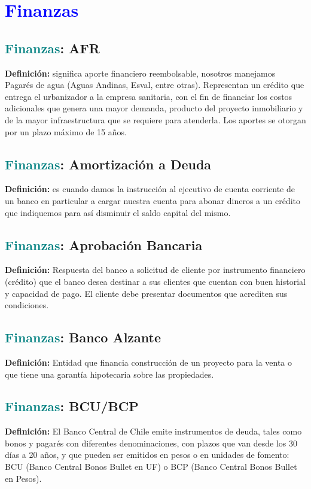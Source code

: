 \documentclass[12pt]{article}
\begin{document}
\section{\textcolor{blue}{Finanzas}}
\subsection{\textcolor{teal}{Finanzas}: AFR}
\textbf{Definición:} significa aporte financiero reembolsable, nosotros manejamos Pagarés de agua (Aguas Andinas, Esval, entre otras). Representan un crédito que entrega el urbanizador a la empresa sanitaria, con el fin de financiar los costos adicionales que genera una mayor demanda, producto del proyecto inmobiliario y de la mayor infraestructura que se requiere para atenderla. Los aportes se otorgan por un plazo máximo de 15 años.
\subsection{\textcolor{teal}{Finanzas}: Amortización a Deuda}
\textbf{Definición:} es cuando damos la instrucción al ejecutivo de cuenta corriente de un banco en particular a cargar nuestra cuenta para abonar dineros a un crédito que indiquemos para así disminuir el saldo capital del mismo. 
\subsection{\textcolor{teal}{Finanzas}: Aprobación Bancaria}
\textbf{Definición:} Respuesta del banco a solicitud de cliente por instrumento financiero (crédito) que el banco desea destinar a sus clientes que cuentan con buen historial y capacidad de pago. El cliente debe presentar documentos que acrediten sus condiciones.
\subsection{\textcolor{teal}{Finanzas}: Banco Alzante}
\textbf{Definición:} Entidad que financia construcción de un proyecto para la venta o que tiene una garantía hipotecaria sobre las propiedades. 
\subsection{\textcolor{teal}{Finanzas}: BCU/BCP}
\textbf{Definición:} El Banco Central de Chile emite instrumentos de deuda, tales como bonos y pagarés con diferentes denominaciones, con plazos que van desde los 30 días a 20 años, y que pueden ser emitidos en pesos o en unidades de fomento: BCU (Banco Central Bonos Bullet en UF) o BCP (Banco Central Bonos Bullet en Pesos).
\end{document}
